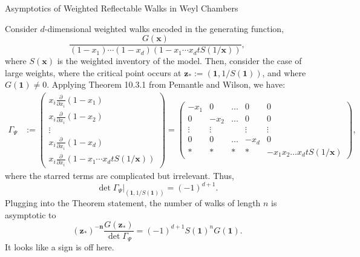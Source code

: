 \documentclass[letterpaper]{article}
\begin{document}
\fontsize{12}{13}
\large

\begin{center}
Asymptotics of Weighted Reflectable Walks in Weyl Chambers
\end{center}

Consider $d$-dimensional weighted walks encoded in the generating function,
\[
\frac{G(\mathbf{x})}{(1 - x_1) \cdots (1 - x_d) (1 - x_1\cdots x_d t S(1/\mathbf{x}))},
\]
where $S(\mathbf{x})$ is the weighted inventory of the model.  Then, consider the case of large weights, where the critical point occurs at $\mathbf{z}_* := (\mathbf{1}, 1/S(\mathbf{1}))$, and where $G(\mathbf{1}) \neq 0$.  Applying Theorem 10.3.1 from Pemantle and Wilson, we have:
\begin{align*}
\Gamma_\Psi &:=
\begin{pmatrix}
x_i \frac{\partial}{\partial x_i} (1 - x_1)\\
x_i \frac{\partial}{\partial x_i} (1 - x_2)\\
\vdots\\
x_i \frac{\partial}{\partial x_i} (1 - x_d)\\
x_i \frac{\partial}{\partial x_i} (1 - x_1\cdots x_d t S(1/\mathbf{x}))
\end{pmatrix}
=
\begin{pmatrix}
-x_1 & 0 & \ldots & 0 & 0\\
0 & -x_2 & \ldots & 0 & 0\\
\vdots & \vdots & &\vdots & \vdots\\
0 & 0 & \ldots & -x_d & 0\\
*&*&*&*& -x_1x_2\ldots x_d t S(1/\mathbf{x})
\end{pmatrix},
\end{align*}
where the starred terms are complicated but irrelevant.  Thus,
\[
\det \Gamma_\Psi\big|_{(\mathbf{1}, 1/S(\mathbf{1}))} = (-1)^{d + 1}.
\]
Plugging into the Theorem statement, the number of walks of length $n$ is asymptotic to
\[
(\mathbf{z_*})^{-\mathbf{n}} \frac{G(\mathbf{z_*})}{\det \Gamma_\Psi} = (-1)^{d+1}S(\mathbf{1})^{n} G(\mathbf{1}).
\]
It looks like a sign is off here.
\end{document}
